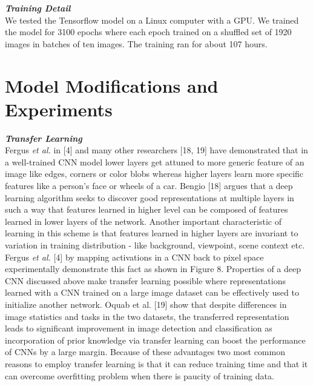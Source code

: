 \documentclass [11pt,letterpaper ,twoside ,openany ]{report}
\begin{document}
    \noindent
    \textbf{\textit{Training Detail}}\\
    We tested the Tensorflow\textsuperscript{\textregistered} model on a Linux computer with a GPU. We trained the model for 3100  epochs where each epoch trained on a shuffled set of 1920 images in batches of ten images. The training ran for about 107 hours.

    \section{Model Modifications and Experiments}

    \noindent
    \textbf{\textit{Transfer Learning}}\\
    Fergus \textit {et al.} in [4] and many other researchers [18, 19] have demonstrated that in a well-trained CNN model lower layers get attuned to more generic feature of an image like edges, corners or color blobs whereas higher layers learn more specific features like a person's face or wheels of a car. Bengio [18] argues that a deep learning algorithm seeks to discover good representations at multiple layers  in such a way that features learned in higher level can be composed of features learned in lower layers of the network. Another important characteristic of learning in this scheme is that features learned in higher layers are invariant to variation in training distribution - like background, viewpoint, scene context etc. Fergus \textit {et al.} [4] by mapping activations in a CNN back to pixel space experimentally demonstrate this fact as shown in Figure 8. Properties of a deep CNN discussed above make transfer learning possible where representations learned with a CNN trained on a large image dataset can be effectively used to  initialize another network. Oquab et al. [19] show that despite differences in image statistics and tasks in the two datasets, the transferred representation leads to significant improvement in image detection and classification as incorporation of prior knowledge via transfer learning can boost the performance of CNNs by a large margin. Because of these advantages two most common reasons to employ transfer learning is that it can reduce training time and that it can overcome overfitting problem when there is paucity of training data.\\
\end{document}
